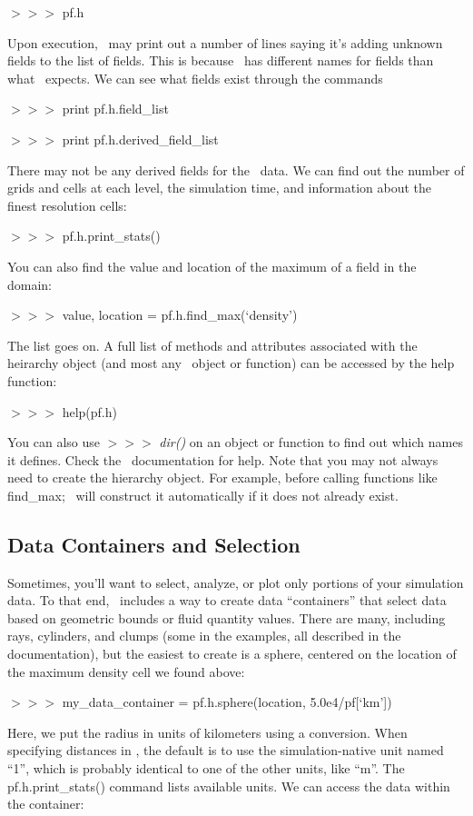 {\scriptsize$>>>$} pf.h

Upon execution, \yt\ may print out a number of lines saying it's adding
unknown fields to the list of fields. This is because \pelelm\ has
different names for fields than what \yt\ expects. We can see what
fields exist through the commands

{\scriptsize$>>>$} print pf.h.field\_list

{\scriptsize$>>>$} print pf.h.derived\_field\_list

There may not be any derived fields for the \pelelm\ data. We can find out
the number of grids and cells at each level, the simulation time, and
information about the finest resolution cells:

{\scriptsize$>>>$} pf.h.print\_stats()

You can also find the value and location of the maximum of a field in
the domain:

{\scriptsize$>>>$} value, location = pf.h.find\_max(`density')

The list goes on. A full list of methods and attributes associated
with the heirarchy object (and most any \yt\ object or function) can be
accessed by the help function:

{\scriptsize$>>>$} help(pf.h)

You can also use {\scriptsize$>>>$} {\it dir()} on an object or
function to find out which names it defines. Check the 
\yt\ documentation for help. Note that you may not always need to create
the hierarchy object.  For example, before calling
functions like find\_max; \yt\ will construct it automatically if it
does not already exist.

\subsection{Data Containers and Selection}

Sometimes, you'll want to select, analyze, or plot only portions of
your simulation data. To that end, \yt\ includes a way to create data
``containers'' that select data based on geometric bounds or fluid
quantity values. There are many, including rays, cylinders, and clumps
(some in the examples, all described in the documentation), but the
easiest to create is a sphere, centered on the location of the maximum
density cell we found above:

{\scriptsize$>>>$} my\_data\_container = pf.h.sphere(location, 5.0e4/pf[`km'])

Here, we put the radius in units of kilometers using a
conversion. When specifying distances in \yt, the default is to use the
simulation-native unit named ``1'', which is probably identical to one
of the other units, like ``m''. The pf.h.print\_stats() command lists
available units. We can access the data within the container:

